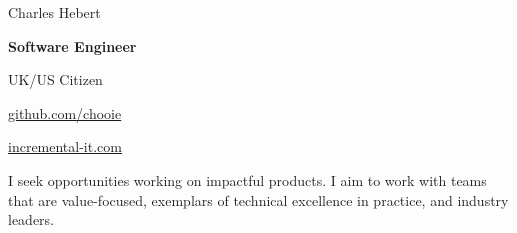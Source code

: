 \begin{center}
  {\Huge Charles Hebert}

  \textbf{Software Engineer}

  UK/US Citizen
\end{center}

\begin{small}

\noindent
\begin{minipage}[t]{0.5\textwidth}
\end{minipage}
\noindent
\noindent
\begin{minipage}[t]{0.5\textwidth}
  \begin{description}
    \raggedleft
    \item[My code] \href{http://www.github.com/chooie}{github.com/chooie}
    \item[Website]
      \href{http://incremental-it.com}{incremental-it.com}
  \end{description}
\end{minipage}
\noindent

\end{small}

\begin{center}
  I seek opportunities working on impactful products. I aim to work with teams
  that are value-focused, exemplars of technical excellence in practice, and
  industry leaders.

\end{center}

